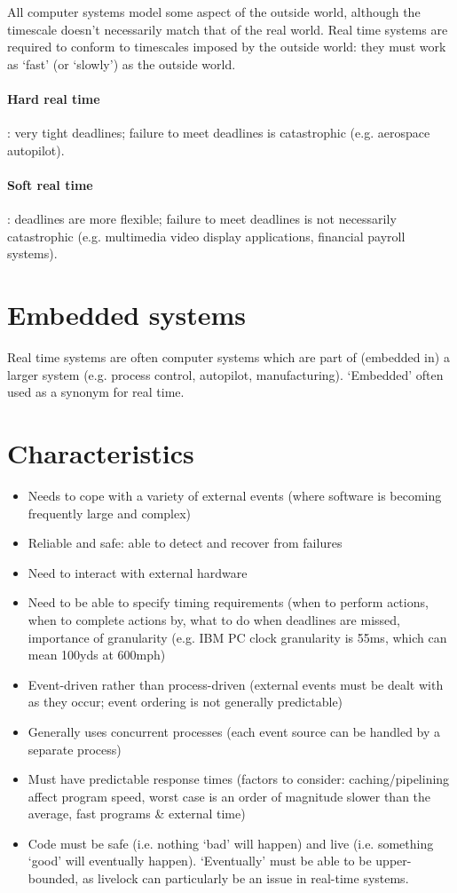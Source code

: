 \documentclass[a4paper,oneside]{report}
\begin{document}
  	All computer systems model some aspect of the outside world, although the timescale doesn't necessarily match that of the real world. Real time systems are required to conform to timescales imposed by the outside world: they must work as `fast' (or `slowly') as the outside world.
  	
  	\paragraph{Hard real time}: very tight deadlines; failure to meet deadlines is catastrophic (e.g. aerospace autopilot).
  	
  	\paragraph{Soft real time}: deadlines are more flexible; failure to meet deadlines is not necessarily catastrophic (e.g. multimedia video display applications, financial payroll systems).
  
  	
  	\section{Embedded systems}
  	Real time systems are often computer systems which are part of (embedded in) a larger system (e.g. process control, autopilot, manufacturing). ‘Embedded’ often used as a synonym for real time.
  	
  	\section{Characteristics}
  	
  	\begin{itemize}
  		\item Needs to cope with a variety of external events (where software is becoming frequently large and complex)
		\item Reliable and safe: able to detect and recover from failures
		\item Need to interact with external hardware
  		\item Need to be able to specify timing requirements (when to perform actions, when to complete actions by, what to do when deadlines are missed, importance of granularity (e.g. IBM PC clock granularity is 55ms, which can mean 100yds at 600mph)
  		\item Event-driven rather than process-driven (external events must be dealt with as they occur; event ordering is not generally predictable)
		\item Generally uses concurrent processes (each event source can be handled by a separate process)  
  		\item Must have predictable response times (factors to consider: caching/pipelining affect program speed, worst case is an order of magnitude slower than the average, fast programs \& external time)
  		\item Code must be safe (i.e. nothing `bad' will happen) and live (i.e. something `good' will eventually happen). `Eventually' must be able to be upper-bounded, as livelock can particularly be an issue in real-time systems.
  	\end{itemize}
  	
\end{document}
